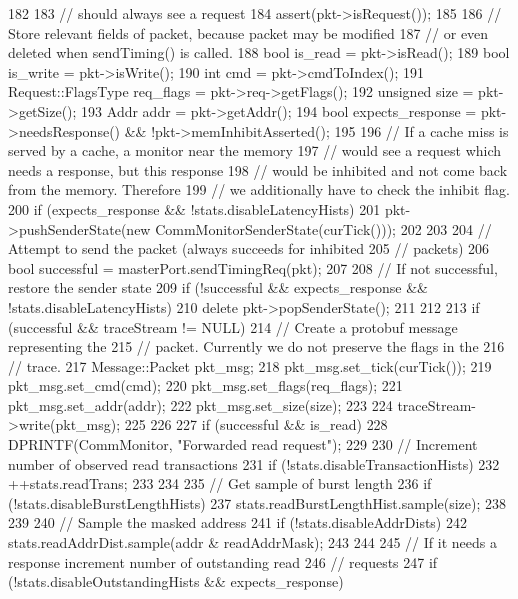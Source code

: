 \begin{DoxyCode}
182 {
183     // should always see a request
184     assert(pkt->isRequest());
185 
186     // Store relevant fields of packet, because packet may be modified
187     // or even deleted when sendTiming() is called.
188     bool is_read = pkt->isRead();
189     bool is_write = pkt->isWrite();
190     int cmd = pkt->cmdToIndex();
191     Request::FlagsType req_flags = pkt->req->getFlags();
192     unsigned size = pkt->getSize();
193     Addr addr = pkt->getAddr();
194     bool expects_response = pkt->needsResponse() && !pkt->memInhibitAsserted();
195 
196     // If a cache miss is served by a cache, a monitor near the memory
197     // would see a request which needs a response, but this response
198     // would be inhibited and not come back from the memory. Therefore
199     // we additionally have to check the inhibit flag.
200     if (expects_response && !stats.disableLatencyHists) {
201         pkt->pushSenderState(new CommMonitorSenderState(curTick()));
202     }
203 
204     // Attempt to send the packet (always succeeds for inhibited
205     // packets)
206     bool successful = masterPort.sendTimingReq(pkt);
207 
208     // If not successful, restore the sender state
209     if (!successful && expects_response && !stats.disableLatencyHists) {
210         delete pkt->popSenderState();
211     }
212 
213     if (successful && traceStream != NULL) {
214         // Create a protobuf message representing the
215         // packet. Currently we do not preserve the flags in the
216         // trace.
217         Message::Packet pkt_msg;
218         pkt_msg.set_tick(curTick());
219         pkt_msg.set_cmd(cmd);
220         pkt_msg.set_flags(req_flags);
221         pkt_msg.set_addr(addr);
222         pkt_msg.set_size(size);
223 
224         traceStream->write(pkt_msg);
225     }
226 
227     if (successful && is_read) {
228         DPRINTF(CommMonitor, "Forwarded read request\n");
229 
230         // Increment number of observed read transactions
231         if (!stats.disableTransactionHists) {
232             ++stats.readTrans;
233         }
234 
235         // Get sample of burst length
236         if (!stats.disableBurstLengthHists) {
237             stats.readBurstLengthHist.sample(size);
238         }
239 
240         // Sample the masked address
241         if (!stats.disableAddrDists) {
242             stats.readAddrDist.sample(addr & readAddrMask);
243         }
244 
245         // If it needs a response increment number of outstanding read
246         // requests
247         if (!stats.disableOutstandingHists && expects_response) {
}}}
\end{DoxyCode}
